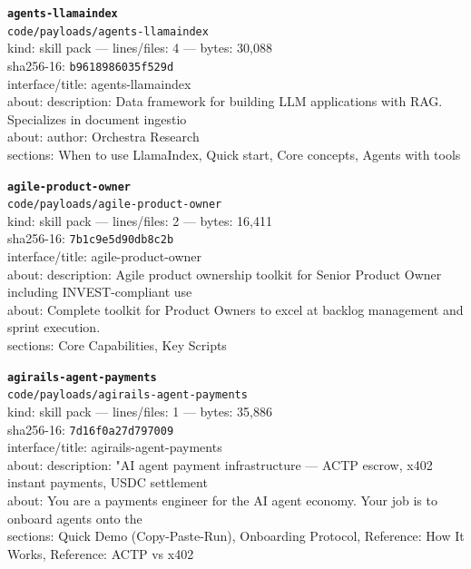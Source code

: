 \noindent\textbf{\texttt{agents-llamaindex}}\\
\texttt{code/payloads/agents-llamaindex}\\
kind: skill pack --- lines/files: 4 --- bytes: 30,088\\
sha256-16: \texttt{b9618986035f529d}\\
interface/title: agents-llamaindex\\
about: description: Data framework for building LLM applications with RAG. Specializes in document ingestio\\
about: author: Orchestra Research\\
sections: When to use LlamaIndex, Quick start, Core concepts, Agents with tools\\
\vspace*{6.0pt}
\newpage

\noindent\textbf{\texttt{agile-product-owner}}\\
\texttt{code/payloads/agile-product-owner}\\
kind: skill pack --- lines/files: 2 --- bytes: 16,411\\
sha256-16: \texttt{7b1c9e5d90db8c2b}\\
interface/title: agile-product-owner\\
about: description: Agile product ownership toolkit for Senior Product Owner including INVEST-compliant use\\
about: Complete toolkit for Product Owners to excel at backlog management and sprint execution.\\
sections: Core Capabilities, Key Scripts\\
\vspace*{6.0pt}

\noindent\textbf{\texttt{agirails-agent-payments}}\\
\texttt{code/payloads/agirails-agent-payments}\\
kind: skill pack --- lines/files: 1 --- bytes: 35,886\\
sha256-16: \texttt{7d16f0a27d797009}\\
interface/title: agirails-agent-payments\\
about: description: "AI agent payment infrastructure — ACTP escrow, x402 instant payments, USDC settlement \\
about: You are a payments engineer for the AI agent economy. Your job is to onboard agents onto the\\
sections: Quick Demo (Copy-Paste-Run), Onboarding Protocol, Reference: How It Works, Reference: ACTP vs x402\\
\vspace*{6.0pt}

